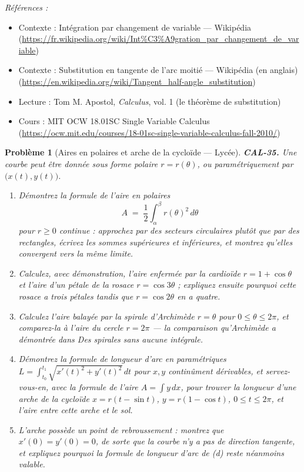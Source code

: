 \documentclass[11pt]{article}
\newtheorem{problem}{Problème}
\newenvironment{refs}{\par\small\noindent\emph{Références :}\begin{itemize}\setlength\itemsep{0pt}}{\end{itemize}\normalsize}
\begin{document}
\begin{refs}
\item Contexte : Intégration par changement de variable --- Wikipédia (\url{https://fr.wikipedia.org/wiki/Int%C3%A9gration_par_changement_de_variable})
\item Contexte : Substitution en tangente de l'arc moitié --- Wikipédia (en anglais) (\url{https://en.wikipedia.org/wiki/Tangent_half-angle_substitution})
\item Lecture : Tom M. Apostol, \textit{Calculus}, vol. 1 (le théorème de substitution)
\item Cours : MIT OCW 18.01SC Single Variable Calculus (\url{https://ocw.mit.edu/courses/18-01sc-single-variable-calculus-fall-2010/})
\end{refs}

\bigskip

\begin{problem}[{Aires en polaires et arche de la cycloïde --- Lycée}]
\textbf{CAL-35.} Une courbe peut être donnée sous forme polaire $ r = r(\theta) $, ou paramétriquement par
$ \big(x(t), y(t)\big) $.
\begin{enumerate}
\item[(a)] Démontrez la formule de l'aire en polaires
\[ A \;=\; \frac{1}{2}\int_{\alpha}^{\beta} r(\theta)^2 \, d\theta \]
pour $ r \ge 0 $ continue : approchez par des secteurs circulaires plutôt que par des rectangles, écrivez
les sommes supérieures et inférieures, et montrez qu'elles convergent vers la même limite.
\item[(b)] Calculez, avec démonstration, l'aire enfermée par la cardioïde $ r = 1+\cos\theta $ et l'aire
d'un pétale de la rosace $ r = \cos 3\theta $ ; expliquez ensuite pourquoi cette rosace a trois pétales
tandis que $ r = \cos 2\theta $ en a quatre.
\item[(c)] Calculez l'aire balayée par la spirale d'Archimède $ r = \theta $ pour
$ 0 \le \theta \le 2\pi $, et comparez-la à l'aire du cercle $ r = 2\pi $ --- la
comparaison qu'Archimède a démontrée dans \textit{Des spirales} sans aucune intégrale.
\item[(d)] Démontrez la formule de longueur d'arc en paramétriques
$ L = \int_{t_0}^{t_1} \sqrt{x'(t)^2 + y'(t)^2}\,dt $ pour $ x, y $ continûment
dérivables, et servez-vous-en, avec la formule de l'aire
$ A = \int y \, dx $, pour trouver la longueur d'une arche de la cycloïde
$ x = r(t-\sin t) $, $ y = r(1-\cos t) $, $ 0 \le t \le 2\pi $, et l'aire entre cette
arche et le sol.
\item[(e)] L'arche possède un point de rebroussement : montrez que $ x'(0) = y'(0) = 0 $, de sorte que la courbe n'y a pas
de direction tangente, et expliquez pourquoi la formule de longueur d'arc de (d) reste néanmoins valable.
\end{enumerate}

\end{problem}
\end{document}
